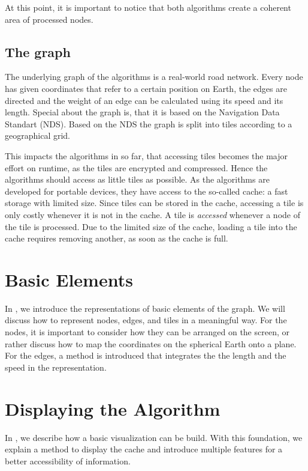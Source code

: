 \documentclass
[
    paper = a4,
    pagesize,
    12 pt,
    oneside,                       %
    open = right,
    DIV = calc,
    BCOR = 0 mm,                   %
    bibtotoc
]
{scrbook}
\begin{document}
At this point, it is important to notice that both algorithms create a coherent area of processed nodes.

\subsection{The graph} \label{spec_graph}

The underlying graph of the algorithms is a real-world road network.
Every node has given coordinates that refer to a certain position on  Earth, the edges are directed and the weight of an edge can be calculated using its speed and its length.
Special about the graph is, that it is based on the Navigation Data Standart (NDS).
Based on the NDS the graph is split into tiles according to a geographical grid.

This impacts the algorithms in so far, that accessing tiles becomes the major effort on runtime, as the tiles are encrypted and compressed.
Hence the algorithms should access as little tiles as possible.
As the algorithms are developed for portable devices, they have access to the so-called cache: a fast storage with limited size.
Since tiles can be stored in the cache, accessing a tile is only costly whenever it is not in the cache.
A tile is \emph{accessed} whenever a node of the tile is processed.
Due to the limited size of the cache, loading a tile into the cache requires removing another, as soon as the cache is full.


\section{Basic Elements}

In , we introduce the representations of basic elements of the graph.
We will discuss how to represent nodes, edges, and tiles in a meaningful way.
For the nodes, it is important to consider how they can be arranged on the screen, or rather discuss how to map the coordinates on the spherical Earth onto a plane.
For the edges, a method is introduced that integrates the the length and the speed in the representation.


\section{Displaying the Algorithm}

In , we describe how a basic visualization can be build.
With this foundation, we explain a method to display the cache and introduce multiple features for a better accessibility of information.
\end{document}
